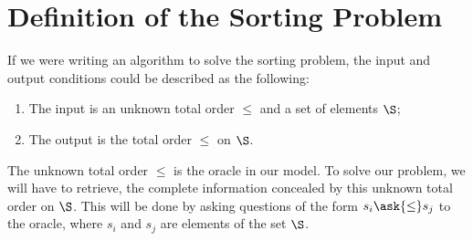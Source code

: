 \section{Definition of the Sorting Problem}
\label{tree:sorting:def}

If we were writing an algorithm to solve the sorting problem, the input and output
conditions could be described as the following:

\begin{enumerate}
\item The input is an unknown total order \(\le\) and a set of elements \(\S\);
\item The output is the total order \(\le\) on \(\S\).
\end{enumerate}

The unknown total order \(\le\) is the oracle in our model. To solve our
problem, we will have to retrieve, the complete information concealed by this
unknown total order on \(\S\). This will be done by asking questions of the
form \(s_i \ask{\le} s_j\) to the oracle, where \(s_i\) and \(s_j\) are
elements of the set \(\S\).

